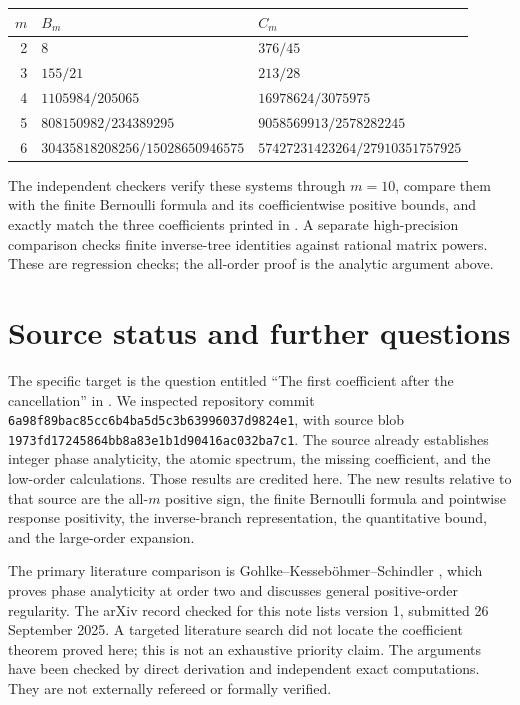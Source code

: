 \documentclass[11pt,a4paper]{article}
\theoremstyle{remark}\newtheorem*{ednote}{Editorial note (ProveIt, 2026-10-01)}
\begin{document}
\begin{center}
\begin{tabular}{rll}\toprule
$m$&$B_m$&$C_m$\\\midrule
2&$8$&$376/45$\\
3&$155/21$&$213/28$\\
4&$1105984/205065$&$16978624/3075975$\\
5&$808150982/234389295$&$9058569913/2578282245$\\
6&$30435818208256/15028650946575$&$57427231423264/27910351757925$\\\bottomrule
\end{tabular}
\end{center}
The independent checkers verify these systems through $m=10$, compare them with the finite Bernoulli formula and its coefficientwise positive bounds, and exactly match the three coefficients printed in \cite{integer}. A separate high-precision comparison checks finite inverse-tree identities against rational matrix powers. These are regression checks; the all-order proof is the analytic argument above.

\section{Source status and further questions}\label{sec:status}
The specific target is the question entitled ``The first coefficient after the cancellation'' in \cite{integer}. We inspected repository commit
\nolinkurl{6a98f89bac85cc6b4ba5d5c3b63996037d9824e1}, with source blob
\nolinkurl{1973fd17245864bb8a83e1b1d90416ac032ba7c1}.
The source already establishes integer phase analyticity, the atomic spectrum, the missing coefficient, and the low-order calculations. Those results are credited here. The new results relative to that source are the all-$m$ positive sign, the finite Bernoulli formula and pointwise response positivity, the inverse-branch representation, the quantitative bound, and the large-order expansion.

The primary literature comparison is Gohlke--Kesseb\"ohmer--Schindler \cite[Theorem 2.7 and following discussion]{gks}, which proves phase analyticity at order two and discusses general positive-order regularity. The arXiv record checked for this note lists version 1, submitted 26 September 2025. A targeted literature search did not locate the coefficient theorem proved here; this is not an exhaustive priority claim. The arguments have been checked by direct derivation and independent exact computations. They are not externally refereed or formally verified.
\end{document}
